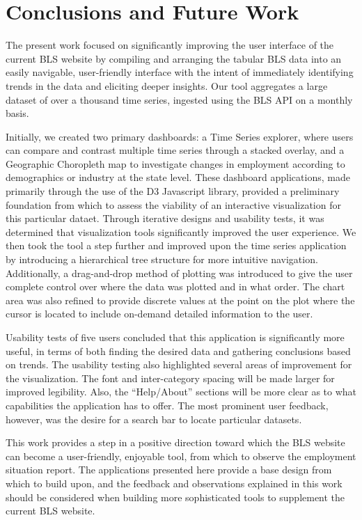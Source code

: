 \documentclass[11pt,letterpaper]{article}
\begin{document}
\section{Conclusions and Future Work}

The present work focused on significantly improving the user interface of the current BLS website by compiling and arranging the tabular BLS data into an easily navigable, user-friendly interface with the intent of immediately identifying trends in the data and eliciting deeper insights. Our tool aggregates a large dataset of over a thousand time series, ingested using the BLS API on a monthly basis.

Initially, we created two primary dashboards: a Time Series explorer, where users can compare and contrast multiple time series through a stacked overlay, and a Geographic Choropleth map to investigate changes in employment according to demographics or industry at the state level. These dashboard applications, made primarily through the use of the D3 Javascript library,  provided a preliminary foundation from which to assess the viability of an interactive visualization for this particular dataet. Through iterative designs and usability tests, it was determined that visualization tools significantly improved the user experience. We then took the tool a step further and improved upon the time series application by introducing a hierarchical tree structure for more intuitive navigation. Additionally, a drag-and-drop method of plotting was introduced to give the user complete control over where the data was plotted and in what order. The chart area was also refined to provide discrete values at the point on the plot where the cursor is located to include on-demand detailed information to the user.

Usability tests of five users concluded that this application is significantly more useful, in terms of both finding the desired data and gathering conclusions based on trends. The usability testing also highlighted several areas of improvement for the visualization. The font and inter-category spacing will be made larger for improved legibility. Also, the ``Help/About'' sections will be more clear as to what capabilities the application has to offer. The most prominent user feedback, however, was the desire for a search bar to locate particular datasets.

This work provides a step in a positive direction toward which the BLS website can become a user-friendly, enjoyable tool, from which to observe the employment situation report. The applications presented here provide a base design from which to build upon, and the feedback and observations explained in this work should be considered when building more sophisticated tools to supplement the current BLS website.
\end{document}
